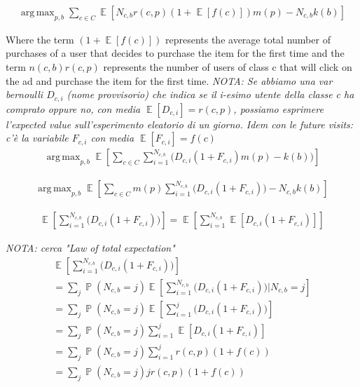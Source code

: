\documentclass[11pt]{article} %
\DeclareMathOperator{\EX}{\mathbb{E}}
\DeclareMathOperator{\Prob}{\mathbb{P}}
\DeclareMathOperator*{\argmax}{arg\,max}
\begin{document}
\begin{align*}
\argmax_{p,b}{\sum_{c \in C}{\EX[N_{c,b}r(c,p)(1+\EX[f(c)])m(p)-N_{c,b}k(b)]}}
\end{align*}

Where the term $(1+\EX[f(c)])$ represents the average total number of purchases of a user that decides to purchase the item for the first time and the term $n(c,b)r(c,p)$ represents the number of users of class c that will click on the ad and purchase the item for the first time.
\newline
\newline
\textit{
NOTA: Se abbiamo una var bernoulli $D_{c,i}$ (nome provvisorio) che indica se il i-esimo utente della classe c ha comprato oppure no, con media $\EX[D_{c,i}]=r(c,p)$, possiamo esprimere l'expected value sull'esperimento eleatorio di un giorno.
Idem con le future visits: c'è la variabile $F_{c,i}$ con media $\EX[F_{c,i}]=f(c)$
}
\begin{align*}
\argmax_{p,b}{\EX\left[\sum_{c \in C}{\sum_{i =1}^{N_{c,b}}{\bigg( D_{c,i}(1+F_{c,i})m(p)-k(b)\bigg)}}\right]}
\end{align*}


\begin{align*}
\argmax_{p,b}{\EX\left[\sum_{c \in C}{m(p)\sum_{i =1}^{N_{c,b}}{\bigg( D_{c,i}(1+F_{c,i})\bigg)}-N_{c,b}k(b)}\right]}
\end{align*}

\begin{align*}
\EX\left[\sum_{i =1}^{N_{c,b}}{\bigg( D_{c,i}(1+F_{c,i})\bigg)}\right]=\EX\left[\sum_{i =1}^{N_{c,b}}{\EX[D_{c,i}(1+F_{c,i})]}\right]
\end{align*}

\textit{NOTA: cerca "Law of total expectation"}
\begin{align*}
\EX\left[\sum_{i =1}^{N_{c,b}}{\bigg( D_{c,i}(1+F_{c,i})\bigg)}\right]\\
=\sum_{j}{\Prob(N_{c,b}=j)\EX\left[\sum_{i =1}^{N_{c,b}}{\bigg( D_{c,i}(1+F_{c,i})\bigg)}|N_{c,b}=j\right]}\\
=\sum_{j}{\Prob(N_{c,b}=j)\EX\left[\sum_{i =1}^{j}{\bigg( D_{c,i}(1+F_{c,i})\bigg)}\right]}\\
=\sum_{j}{\Prob(N_{c,b}=j)\sum_{i =1}^{j}{\EX\left[ D_{c,i}(1+F_{c,i})\right]}}\\
=\sum_{j}{\Prob(N_{c,b}=j)\sum_{i =1}^{j}{ r(c,p)(1+f(c))}}\\
=\sum_{j}{\Prob(N_{c,b}=j) jr(c,p)(1+f(c))}
\end{align*}
\end{document}

